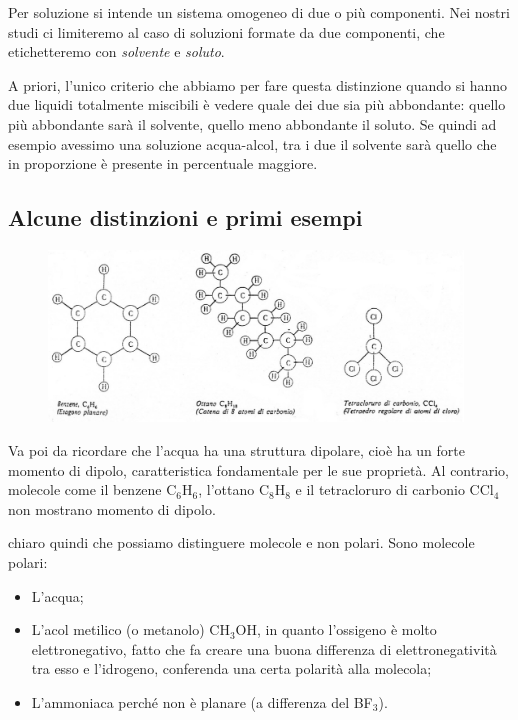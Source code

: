 Per soluzione si intende un sistema omogeneo di due o più componenti. Nei nostri studi ci limiteremo al caso di soluzioni formate da due componenti, che etichetteremo con \textit{solvente} e \textit{soluto}.

A priori, l'unico criterio che abbiamo per fare questa distinzione quando si hanno due liquidi totalmente miscibili è vedere quale dei due sia più abbondante: quello più abbondante sarà il solvente, quello meno abbondante il soluto. Se quindi ad esempio avessimo una soluzione acqua-alcol, tra i due il solvente sarà quello che in proporzione è presente in percentuale maggiore.

\subsection{Alcune distinzioni e primi esempi}

\begin{figure}[htp]
    \centering
    \includegraphics[width=11cm]{immagini/molecole_non_polari.png}
\end{figure}

Va poi da ricordare che l'acqua ha una struttura dipolare, cioè ha un forte momento di dipolo, caratteristica fondamentale per le sue proprietà. Al contrario, molecole come il benzene C$_6$H$_6$, l'ottano C$_8$H$_8$ e il tetracloruro di carbonio CCl$_4$ non mostrano momento di dipolo.

\E chiaro quindi che possiamo distinguere molecole e non polari. Sono molecole polari:

\begin{itemize}
    \item L'acqua;
    \item L'acol metilico (o metanolo) CH$_3$OH, in quanto l'ossigeno è molto elettronegativo, fatto che fa creare una buona differenza di elettronegatività tra esso e l'idrogeno, conferenda una certa polarità alla molecola;
    \item L'ammoniaca perché non è planare (a differenza del BF$_3$).
\end{itemize}

